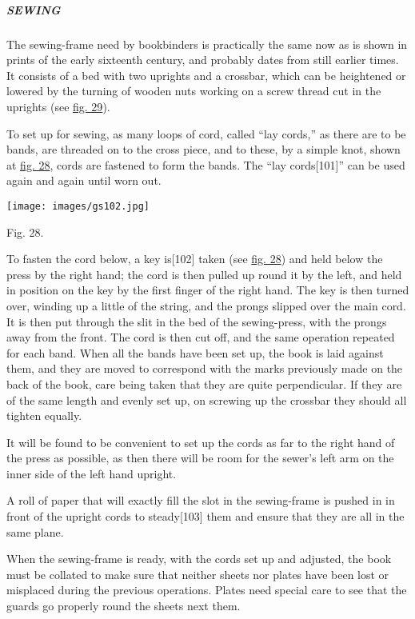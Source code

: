 \documentclass[
]{article}
\begin{document}
\hypertarget{sewing}{%
\subparagraph{SEWING}\label{sewing}}

The sewing-frame need by bookbinders is practically the same now as is
shown in prints of the early sixteenth century, and probably dates from
still earlier times. It consists of a bed with two uprights and a
crossbar, which can be heightened or lowered by the turning of wooden
nuts working on a screw thread cut in the uprights (see
\protect\hyperlink{Fig_29}{fig. 29}).

To set up for sewing, as many loops of cord, called ``lay cords,'' as
there are to be bands, are threaded on to the cross piece, and to these,
by a simple knot, shown at \protect\hyperlink{Fig_28}{fig. 28}, cords
are fastened to form the bands. The ``lay
cords{\protect\hypertarget{Page_101}{}{{[}101{]}}}'' can be used again
and again until worn out.

\protect\hypertarget{Fig_28}{}{}
\texttt{[image: images/gs102.jpg]}

Fig. 28.

To fasten the cord below, a key
is{\protect\hypertarget{Page_102}{}{{[}102{]}}} taken (see
\protect\hyperlink{Fig_28}{fig. 28}) and held below the press by the
right hand; the cord is then pulled up round it by the left, and held in
position on the key by the first finger of the right hand. The key is
then turned over, winding up a little of the string, and the prongs
slipped over the main cord. It is then put through the slit in the bed
of the sewing-press, with the prongs away from the front. The cord is
then cut off, and the same operation repeated for each band. When all
the bands have been set up, the book is laid against them, and they are
moved to correspond with the marks previously made on the back of the
book, care being taken that they are quite perpendicular. If they are of
the same length and evenly set up, on screwing up the crossbar they
should all tighten equally.

It will be found to be convenient to set up the cords as far to the
right hand of the press as possible, as then there will be room for the
sewer's left arm on the inner side of the left hand upright.

A roll of paper that will exactly fill the slot in the sewing-frame is
pushed in in front of the upright cords to
steady{\protect\hypertarget{Page_103}{}{{[}103{]}}} them and ensure that
they are all in the same plane.

When the sewing-frame is ready, with the cords set up and adjusted, the
book must be collated to make sure that neither sheets nor plates have
been lost or misplaced during the previous operations. Plates need
special care to see that the guards go properly round the sheets next
them.
\end{document}
